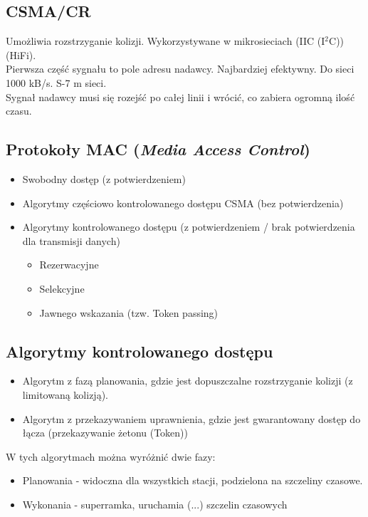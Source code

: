 		\subsection{CSMA/CR}
			Umożliwia rozstrzyganie kolizji. Wykorzystywane w mikrosieciach (IIC (I$ ^2 $C)) (HiFi).\\
			Pierwsza część sygnału to pole adresu nadawcy. Najbardziej efektywny. Do sieci 1000 kB/s. S-7 m sieci.\\
			Sygnał nadawcy musi się rozejść po całej linii i wrócić, co zabiera ogromną ilość czasu.
		\subsection{Protokoły MAC (\emph{Media Access Control})}
			\begin{itemize}
				\item Swobodny dostęp (z potwierdzeniem)
				\item Algorytmy częściowo kontrolowanego dostępu CSMA (bez potwierdzenia)
				\item Algorytmy kontrolowanego dostępu (z potwierdzeniem / brak potwierdzenia dla transmisji danych)
				\begin{itemize}
					\item Rezerwacyjne
					\item Selekcyjne
					\item Jawnego wskazania (tzw. Token passing)
				\end{itemize}
			\end{itemize}
		\subsection{Algorytmy kontrolowanego dostępu}
			\begin{itemize}
				\item Algorytm z fazą planowania, gdzie jest dopuszczalne rozstrzyganie kolizji (z limitowaną kolizją).
				\item Algorytm z przekazywaniem uprawnienia, gdzie jest gwarantowany dostęp do łącza (przekazywanie żetonu (Token))
			\end{itemize}
			W tych algorytmach można wyróżnić dwie fazy:
			\begin{itemize}
				\item Planowania - widoczna dla wszystkich stacji, podzielona na szczeliny czasowe.
				\item Wykonania - superramka, uruchamia (...) szczelin czasowych
			\end{itemize}
